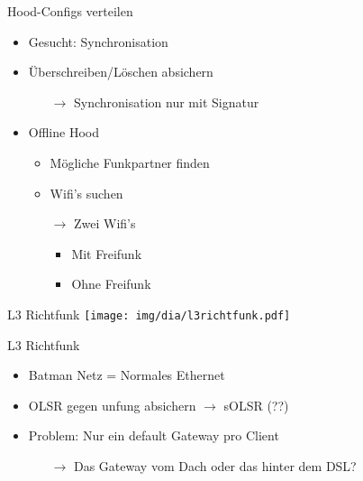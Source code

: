 \begin{frame}{Hood-Configs verteilen}
    \begin{itemize}
        \item Gesucht: Synchronisation
        \item Überschreiben/Löschen absichern
        \begin{itemize}
            \item[$\rightarrow$] Synchronisation nur mit Signatur
        \end{itemize}
        \item Offline Hood
        \begin{itemize}
            \item Mögliche Funkpartner finden
            \item Wifi's suchen
            \item[$\rightarrow$] Zwei Wifi's
            \begin{itemize}
                \item Mit Freifunk
                \item Ohne Freifunk
            \end{itemize}
        \end{itemize}
    \end{itemize}
\end{frame}

\begin{frame}{L3 Richtfunk}
    \center
    \texttt{[image: img/dia/l3richtfunk.pdf]}
\end{frame}

\begin{frame}{L3 Richtfunk}
    \begin{itemize}
        \item Batman Netz = Normales Ethernet
        \item OLSR gegen unfung absichern $\rightarrow$ sOLSR (??)
        \item Problem: Nur ein default Gateway pro Client
        \begin{itemize}
            \item[$\rightarrow$] Das Gateway vom Dach oder das hinter dem DSL?
        \end{itemize}
    \end{itemize}
\end{frame}
